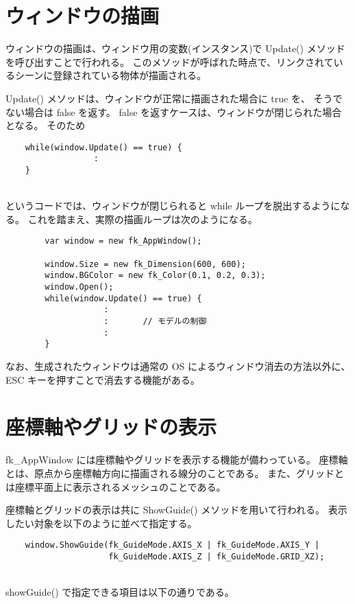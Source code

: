 \section{ウィンドウの描画}
ウィンドウの描画は、ウィンドウ用の変数(インスタンス)で Update() メソッドを呼び出すことで行われる。
このメソッドが呼ばれた時点で、リンクされているシーンに登録されている物体が描画される。

Update() メソッドは、ウィンドウが正常に描画された場合に true を、
そうでない場合は false を返す。
false を返すケースは、ウィンドウが閉じられた場合となる。
そのため
\\
\begin{screen}
\begin{verbatim}
    while(window.Update() == true) {
                  :
    }
\end{verbatim}
\end{screen}
~ \\
というコードでは、ウィンドウが閉じられると while ループを脱出するようになる。
これを踏まえ、実際の描画ループは次のようになる。
\\
\begin{breakbox}
\begin{verbatim}
        var window = new fk_AppWindow();

        window.Size = new fk_Dimension(600, 600);
        window.BGColor = new fk_Color(0.1, 0.2, 0.3);
        window.Open();
        while(window.Update() == true) {
                    :
                    :       // モデルの制御
                    :
        }       
\end{verbatim}
\end{breakbox}

なお、生成されたウィンドウは通常の OS によるウィンドウ消去の方法以外に、
ESC キーを押すことで消去する機能がある。

\section{座標軸やグリッドの表示}
fk\_AppWindow には座標軸やグリッドを表示する機能が備わっている。
座標軸とは、原点から座標軸方向に描画される線分のことである。
また、グリッドとは座標平面上に表示されるメッシュのことである。

座標軸とグリッドの表示は共に ShowGuide() メソッドを用いて行われる。
表示したい対象を以下のように並べて指定する。
\\
\begin{screen}
\begin{verbatim}
    window.ShowGuide(fk_GuideMode.AXIS_X | fk_GuideMode.AXIS_Y |
                     fk_GuideMode.AXIS_Z | fk_GuideMode.GRID_XZ);
\end{verbatim}
\end{screen}
~ \\
showGuide() で指定できる項目は以下の通りである。

